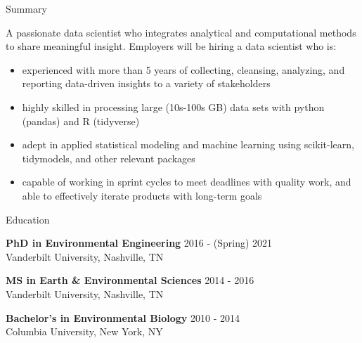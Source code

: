 \documentclass{resume} %
\begin{document}

\begin{rSection}{Summary}

A passionate data scientist who integrates analytical and computational methods to share meaningful insight. Employers will be hiring a data scientist who is:
{\begin{itemize}
    \item {experienced with more than 5 years of collecting, cleansing, analyzing, and reporting data-driven insights to a variety of stakeholders}
    \item {highly skilled in processing large (10s-100s GB) data sets with python (pandas) and R (tidyverse)}
    \item {adept in applied statistical modeling and machine learning using scikit-learn, tidymodels, and other relevant packages}
    \item {capable of working in sprint cycles to meet deadlines with quality work, and able to effectively iterate products with long-term goals}    
\end{itemize} }

\end{rSection}


\begin{rSection}{Education}

{\bf PhD in Environmental Engineering} \hfill {2016 - (Spring) 2021}
\\ 
Vanderbilt University, Nashville, TN 

{\bf MS in Earth \& Environmental Sciences}  \hfill {2014 - 2016}
\\
Vanderbilt University, Nashville, TN
 
{\bf Bachelor's in Environmental Biology}  \hfill {2010 - 2014}
\\
Columbia University, New York, NY

\end{rSection}
\end{document}

